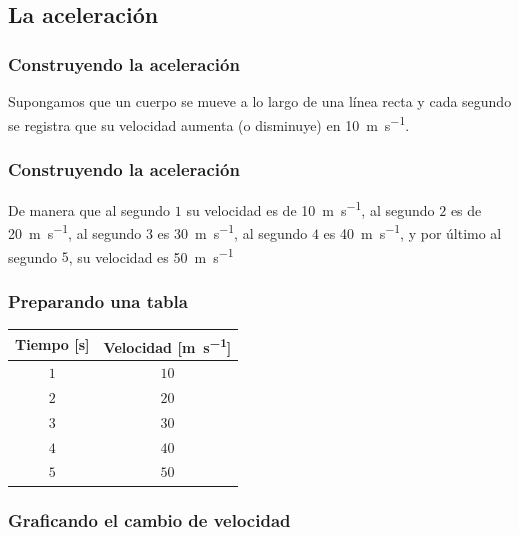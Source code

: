 \documentclass[14pt]{beamer}
\begin{document}
\subsection{La aceleración}

\begin{frame}
\frametitle{Construyendo la aceleración}
Supongamos que un cuerpo se mueve a lo largo de una línea recta y cada segundo se registra que su velocidad aumenta (o disminuye) en \SI{10}{\meter\per\second}.
\end{frame}
\begin{frame}
\frametitle{Construyendo la aceleración}
De manera que al segundo $1$ su velocidad es de \SI{10}{\meter\per\second}, \pause al segundo $2$ es de \SI{20}{\meter\per\second}, \pause al segundo $3$ es \SI{30}{\meter\per\second}, \pause al segundo $4$ es \SI{40}{\meter\per\second}, \pause y por último al segundo $5$, su velocidad es \SI{50}{\meter\per\second}
\end{frame}
\begin{frame}
\frametitle{Preparando una tabla}
\begin{table}
\renewcommand{\arraystretch}{1}
\centering
\begin{tabular}{c | c}
Tiempo [\unit{\second}] & Velocidad [\unit{\meter\per\second}] \\ \hline
$1$ & $10$ \\ \hline
$2$ & $20$ \\ \hline
$3$ & $30$ \\ \hline
$4$ & $40$ \\ \hline
$5$ & $50$ \\ \hline
\end{tabular}
\end{table}
\end{frame}
\begin{frame}
\frametitle{Graficando el cambio de velocidad}
\begin{figure}
    \centering
\end{figure}
\end{frame}
\end{document}
